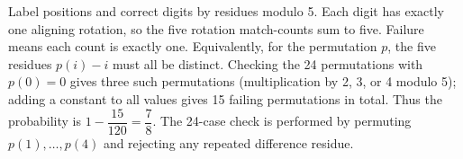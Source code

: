 Label positions and correct digits by residues modulo 5. Each digit has exactly one aligning rotation, so the five rotation match-counts sum to five. Failure means each count is exactly one. Equivalently, for the permutation $p$, the five residues $p(i)-i$ must all be distinct. Checking the 24 permutations with $p(0)=0$ gives three such permutations (multiplication by 2, 3, or 4 modulo 5); adding a constant to all values gives 15 failing permutations in total. Thus the probability is $1 - \dfrac{15}{120} = \boxed{\dfrac{7}{8}}$. The 24-case check is performed by permuting $p(1),\ldots,p(4)$ and rejecting any repeated difference residue.
